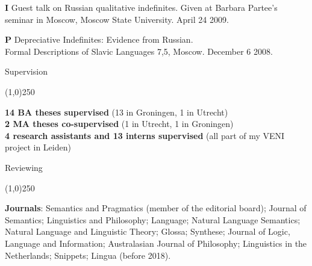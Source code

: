 \documentclass[12pt,letterpaper]{article}
\begin{document}
{\begin{hangparas}{.25in}{1}
\vspace{1mm}

\textbf{I} \hspace{2mm} Guest talk on Russian qualitative indefinites. Given at Barbara Partee's seminar in Moscow, Moscow State University. April 24 2009.

\vspace{1mm}

\textbf{P} \hspace{1.2mm} Depreciative Indefinites: Evidence from Russian. \\Formal Descriptions of Slavic Languages 7,5, Moscow. December 6 2008.

\end{hangparas}

\vspace{6mm}

\noindent \Large{Supervision}

\vspace{-4mm}
\noindent\line(1,0){250}

\vspace{2mm}
\small{


\noindent \textbf{14 BA theses supervised} (13 in Groningen, 1 in Utrecht)\\
\noindent \textbf{2 MA theses co-supervised} (1 in Utrecht, 1 in Groningen)\\
\noindent \textbf{4 research assistants and 13 interns supervised} (all part of my VENI project in Leiden)
}

\vspace{6mm}

\noindent \Large{Reviewing}

\vspace{-4mm}
\noindent\line(1,0){250}

\vspace{2mm}

\small{
\begin{hangparas}{.65in}{1} 

\textbf{Journals}: Semantics and Pragmatics (member of the editorial board); Journal of Semantics; Linguistics and Philosophy; Language; Natural Language Semantics; Natural Language and Linguistic Theory; Glossa; Synthese; Journal of Logic, Language and Information; Australasian Journal of Philosophy; Linguistics in the Netherlands; Snippets; Lingua (before 2018).

\end{hangparas}
\vspace{2mm}
\begin{hangparas}{.89in}{1} 


\end{hangparas}}}
\end{document}
